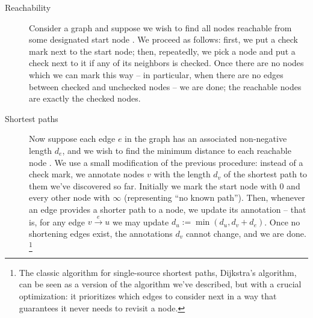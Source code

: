 \begin{description}


\item[Reachability] %
%
Consider a graph and suppose we wish to find all nodes reachable from some
designated start node%
. We proceed as follows:
first, we put a check mark next to the start node; then, repeatedly, we pick a
node and put a check next to it if any of its neighbors is checked. Once there
are no nodes which we can mark this way -- in particular, when there are no
edges between checked and unchecked nodes -- we are done; the reachable nodes
are exactly the checked nodes.





\item[Shortest paths]
%
Now suppose each edge $e$ in the graph has an associated non-negative length
$d_e$, and we wish to find the minimum distance to each reachable
node%
. We use a small modification of the previous
procedure: instead of a check mark, we annotate nodes $v$ with the length $d_v$
of the shortest path to them we've discovered so far. Initially we mark the
start node with 0 and every other node with $\infty$ (representing ``no known
path'').
%
%
%
Then, whenever an edge provides a shorter path to a node, we update its
annotation -- that is, for any edge $v \xrightarrow{e} u$ we may update $d_u :=
\min(d_u, d_v + d_e)$.
%
Once no shortening edges exist, the annotations $d_v$ cannot change, and we are done.%
%
%
\footnote{The classic algorithm for single-source shortest paths, Dijkstra's
  algorithm, can be seen as a version of the algorithm we've described, but with
  a crucial optimization: it prioritizes which edges to consider next in a
  way that guarantees it never needs to revisit a node.}


\end{description}

